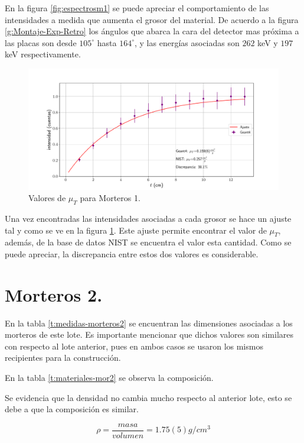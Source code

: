 En la figura \ref{fig:espectrosm1} se puede apreciar el comportamiento de las intensidades a medida que aumenta el grosor del material. De acuerdo a la figura \ref{g:Montaje-Exp-Retro} los ángulos que abarca la cara del detector mas próxima a las placas son desde $105^\circ$ hasta $164^\circ$, y las energías asociadas son $262$ keV y $197$ keV respectivamente. 
 
\begin{figure}[H]
	\centering
	\includegraphics[width=1.0\linewidth]{Kap4/mu_T-m1.pdf}
	\caption{Valores de $\mu_T$ para Morteros 1.}
	\label{fig:mut-m1}
\end{figure}

Una vez encontradas las intensidades asociadas a cada grosor se hace un ajuste tal y como se ve en la figura \ref{fig:mut-m1}. Este ajuste permite encontrar el valor de $\mu_T$, además, de la base de datos NIST se encuentra el valor esta cantidad. Como se puede apreciar, la discrepancia entre estos dos valores es considerable.

 \section{Morteros 2.}
 
 En la tabla \ref{t:medidas-morteros2} se encuentran las dimensiones asociadas a los morteros de este lote. Es importante mencionar que dichos valores son similares con respecto al lote anterior, pues en ambos casos se usaron los mismos recipientes para la construcción.
 
 

 
 En la tabla \ref{t:materiales-mor2} se observa la composición.
 

 
 Se evidencia que la densidad no cambia mucho respecto al anterior lote, esto se debe a que la composición es similar.
 
 \begin{equation} \label{densidad-mor2}
    \rho=\frac{masa}{volumen}=1.75(5) g/cm^3
 \end{equation}
 
